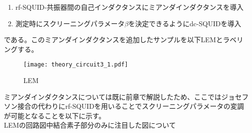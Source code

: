 \begin{enumerate}
    \item rf-SQUID-共振器間の自己インダクタンスにミアンダインダクタンスを導入
    \item 測定時にスクリーニングパラメータ$\beta$を決定できるようにdc-SQUIDを導入
 \end{enumerate}
 である。このミアンダインダクタンスを追加したサンプルを以下LEMとラベリングする。
 \begin{figure}[H]
    \centering
    \texttt{[image: theory\_circuit3\_1.pdf]}
    \caption{LEM}
\end{figure}
ミアンダインダクタンスについては既に前章で解説したため、ここではジョセフソン接合の代わりにrf-SQUIDを用いることでスクリーニングパラメータの変調が可能となることを以下に示す。\\
LEMの回路図中結合素子部分のみに注目した図について

